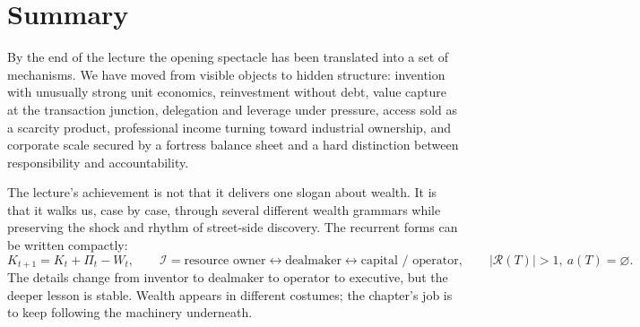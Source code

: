 \section{Summary}

By the end of the lecture the opening spectacle has been translated into a set of mechanisms. We have moved from visible objects to hidden structure: invention with unusually strong unit economics, reinvestment without debt, value capture at the transaction junction, delegation and leverage under pressure, access sold as a scarcity product, professional income turning toward industrial ownership, and corporate scale secured by a fortress balance sheet and a hard distinction between responsibility and accountability.

The lecture's achievement is not that it delivers one slogan about wealth. It is that it walks us, case by case, through several different wealth grammars while preserving the shock and rhythm of street-side discovery. The recurrent forms can be written compactly:
\[
K_{t+1}=K_t+\Pi_t-W_t, \qquad
\mathcal I=\text{resource owner}\longleftrightarrow \text{dealmaker}\longleftrightarrow \text{capital / operator}, \qquad
|\mathcal R(T)|>1,\ a(T)=\varnothing.
\]
The details change from inventor to dealmaker to operator to executive, but the deeper lesson is stable. Wealth appears in different costumes; the chapter's job is to keep following the machinery underneath.